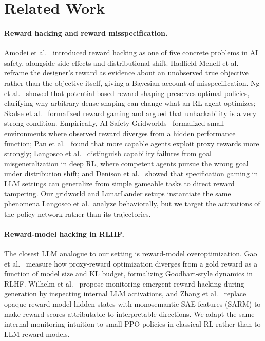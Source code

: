 \documentclass[11pt]{article}
\begin{document}
\section{Related Work}

\paragraph{Reward hacking and reward misspecification.}
Amodei et al.~\cite{amodei2016concrete} introduced reward hacking as one of five concrete problems in AI safety, alongside side effects and distributional shift. Hadfield-Menell et al.~\cite{hadfieldmenell2017ird} reframe the designer's reward as evidence about an unobserved true objective rather than the objective itself, giving a Bayesian account of misspecification. Ng et al.~\cite{ng1999shaping} showed that potential-based reward shaping preserves optimal policies, clarifying why arbitrary dense shaping can change what an RL agent optimizes; Skalse et al.~\cite{skalse2022rewardgaming} formalized reward gaming and argued that unhackability is a very strong condition. Empirically, AI Safety Gridworlds~\cite{leike2017gridworlds} formalized small environments where observed reward diverges from a hidden performance function; Pan et al.~\cite{pan2022misspecification} found that more capable agents exploit proxy rewards more strongly; Langosco et al.~\cite{langosco2022goalmisgeneralization} distinguish capability failures from goal misgeneralization in deep RL, where competent agents pursue the wrong goal under distribution shift; and Denison et al.~\cite{denison2024subterfuge} showed that specification gaming in LLM settings can generalize from simple gameable tasks to direct reward tampering. Our gridworld and LunarLander setups instantiate the same phenomena Langosco et al.~analyze behaviorally, but we target the activations of the policy network rather than its trajectories.

\paragraph{Reward-model hacking in RLHF.}
The closest LLM analogue to our setting is reward-model overoptimization. Gao et al.~\cite{gao2023scalinglaws} measure how proxy-reward optimization diverges from a gold reward as a function of model size and KL budget, formalizing Goodhart-style dynamics in RLHF. Wilhelm et al.~\cite{wilhelm2026monitoring} propose monitoring emergent reward hacking during generation by inspecting internal LLM activations, and Zhang et al.~\cite{zhang2025sarm} replace opaque reward-model hidden states with monosemantic SAE features (SARM) to make reward scores attributable to interpretable directions. We adapt the same internal-monitoring intuition to small PPO policies in classical RL rather than to LLM reward models.
\end{document}
